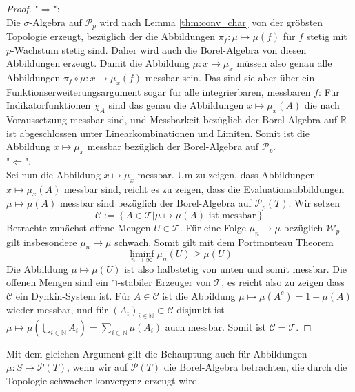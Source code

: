 \begin{proof}
"$\Rightarrow$": \\
Die $\sigma$-Algebra auf $\mathcal{P}_p$ wird nach Lemma \ref{thm:conv_char} von der gröbsten Topologie erzeugt, bezüglich der die Abbildungen $\pi_f: \mu \mapsto \mu(f)$ für $f$ stetig mit $p$-Wachstum stetig sind. Daher wird auch die Borel-Algebra von diesen Abbildungen erzeugt. Damit die Abbildung $\mu: x\mapsto \mu_x$ müssen also genau alle Abbildungen $\pi_f \circ \mu: x\mapsto \mu_x(f)$ messbar sein. Das sind sie aber über ein Funktionserweiterungsargument sogar für alle integrierbaren, messbaren $f$: Für Indikatorfunktionen $\chi_A$ sind das genau die Abbildungen $x\mapsto \mu_x(A)$ die nach Voraussetzung messbar sind, und Messbarkeit bezüglich der Borel-Algebra auf $\mathbb{R}$ ist abgeschlossen unter Linearkombinationen und Limiten. Somit ist die Abbildung $x \mapsto \mu_x$ messbar bezüglich der Borel-Algebra auf $\mathcal{P}_p$. \\
"$\Leftarrow$": \\
Sei nun die Abbildung $x \mapsto \mu_x$ messbar. Um zu zeigen, dass Abbildungen $x\mapsto \mu_x(A)$ messbar sind, reicht es zu zeigen, dass die Evaluationsabbildungen $\mu \mapsto \mu(A)$ messbar sind bezüglich der Borel-Algebra auf $\mathcal{P}_p(T)$. Wir setzen
$$\mathcal{C}:=\left\{A \in \mathcal{T} \vert \mu \mapsto \mu(A) \text{ ist messbar}\right\}$$
Betrachte zunächst offene Mengen $U\in \mathcal{T}$. Für eine Folge $\mu_n \rightarrow \mu$ bezüglich $\mathcal{W}_p$ gilt insbesondere $\mu_n\rightarrow \mu$ schwach. Somit gilt mit dem Portmonteau Theorem
$$\liminf_{n\rightarrow\infty}\mu_n(U) \geq \mu(U)$$
Die Abbildung $\mu \mapsto \mu(U)$ ist also halbstetig von unten und somit messbar. Die offenen Mengen sind ein $\cap$-stabiler Erzeuger von $\mathcal{T}$, es reicht also zu zeigen dass $\mathcal{C}$ ein Dynkin-System ist. Für $A\in\mathcal{C}$ ist die Abbildung $\mu \mapsto \mu(A^c)=1-\mu(A)$ wieder messbar, und für $(A_i)_{i\in\mathbb{N}}\subset \mathcal{C}$ disjunkt ist 
$\mu\mapsto \mu(\bigcup_{i\in\mathbb{N}}A_i)=\sum_{i\in\mathbb{N}}\mu(A_i)$ auch messbar. Somit ist $\mathcal{C}=\mathcal{T}$.
\end{proof}
\begin{remark}\label{rem:kernel_char_no_p}
Mit dem gleichen Argument gilt die Behauptung auch für Abbildungen $\mu: S \mapsto \mathcal{P}(T)$, wenn wir auf $\mathcal{P}(T)$ die Borel-Algebra betrachten, die durch die Topologie schwacher konvergenz erzeugt wird.
\end{remark}
